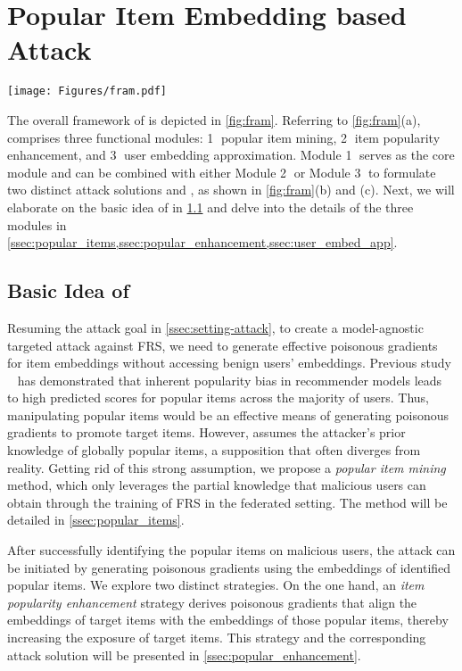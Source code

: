 \section{Popular Item Embedding based Attack}
\label{sec:attack}
\begin{figure*}[ht]
\centering
    \texttt{[image: Figures/fram.pdf]} %
    \caption{Overview of \model{}: (a) functional modules in \model{}, (b) the \modelI{} solution, and (c) the \modelII{} solution.} 
    \label{fig:fram}
\end{figure*}
The overall framework of \model{} is depicted in \cref{fig:fram}.
Referring to \cref{fig:fram}(a), \model{} comprises three functional modules: \textcircled{1} popular item mining, \textcircled{2} item popularity enhancement, and \textcircled{3} user embedding approximation. Module \textcircled{1} serves as the core module and can be combined with either Module \textcircled{2} or Module \textcircled{3} to formulate two distinct attack solutions \modelI{} and \modelII{}, as shown in \cref{fig:fram}(b) and (c).
% 
Next, we will elaborate on the basic idea of \model{} in \cref{ssec:overview} and delve into the details of the three modules in \cref{ssec:popular_items,ssec:popular_enhancement,ssec:user_embed_app}.

\subsection{Basic Idea of \model{}}
\label{ssec:overview}

Resuming the attack goal in \cref{ssec:setting-attack}, to create a model-agnostic targeted attack against FRS, we need to generate effective poisonous gradients for item embeddings without accessing benign users' embeddings.
Previous study \PIP{}~\cite{pipattack} has demonstrated that inherent popularity bias in recommender models leads to high predicted scores for popular items across the majority of users. Thus, manipulating popular items would be an effective means of generating poisonous gradients to promote target items.
However, \PIP{} assumes the attacker's prior knowledge of globally popular items, a supposition that often diverges from reality.
Getting rid of this strong assumption, we propose a \emph{popular item mining} method, which only leverages the partial knowledge that malicious users can obtain through the training of FRS in the federated setting. The method will be detailed in \cref{ssec:popular_items}.

After successfully identifying the popular items on malicious users, the attack can be initiated by generating poisonous gradients using the embeddings of identified popular items.
We explore two distinct strategies.
On the one hand, an \emph{item popularity enhancement} strategy derives poisonous gradients that align the embeddings of target items with the embeddings of those popular items, thereby increasing the exposure of target items.
This strategy and the corresponding attack solution \modelI{} will be presented in \cref{ssec:popular_enhancement}.


